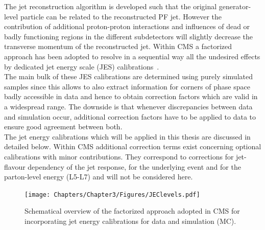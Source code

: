 The jet reconstruction algorithm is developed such that the original generator-level particle can be related to the reconstructed PF jet. However the contribution of additional proton-proton interactions and influences of dead or badly functioning regions in the different subdetectors will slightly decrease the transverse momentum of the reconstructed jet.
Within CMS a factorized approach has been adopted to resolve in a sequential way all the undesired effects by dedicated jet energy scale (JES) calibrations~\cite{}.
\\
The main bulk of these JES calibrations are determined using purely simulated samples since this allows to also extract information for corners of phase space badly accessible in data and hence to obtain correction factors which are valid in a widespread range. The downside is that whenever discrepancies between data and simulation occur, additional correction factors have to be applied to data to ensure good agreement between both.
\\
The jet energy calibrations which will be applied in this thesis are discussed in detailed below. 
Within CMS additional correction terms exist concerning optional calibrations with minor contributions. They correspond to corrections for jet-flavour dependency of the jet response, for the underlying event and for the parton-level energy (L5-L7) and will not be considered here.
\begin{figure}[h!t]
 \centering
 \texttt{[image: Chapters/Chapter3/Figures/JEClevels.pdf]}
 \caption{Schematical overview of the factorized approach adopted in CMS for incorporating jet energy calibrations for data and simulation (MC).}
 \label{fig::JEClevels}
\end{figure}

